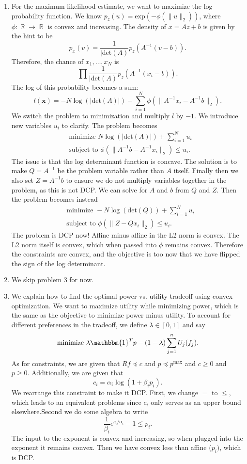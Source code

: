 \documentclass{article}
\DeclareMathOperator{\R}{\mathbb{R}}
\begin{document}
\begin{enumerate}
    \item For the maximum likelihood estimate, we want to maximize the log probability function. We know $p_z(u) = \text{exp}(-\phi(\|u\|_2))$, where $\phi : \R \to \R$ is convex and increasing. The density of $x = Az + b$ is given by the hint to be \[
        p_x(v) = \frac{1}{|\text{det}(A)} p_z(A^{-1}(v - b)).
    \] Therefore, the chance of $x_1, \dots, x_N$ is \[
        \prod \frac{1}{|\text{det}(A)} p_z(A^{-1}(x_i - b)).
    \] The log of this probability becomes a sum: \[
        l(\mathbf{x}) = -N \log(|\text{det}(A)|) - \sum_{i=1}^N \phi(\|A^{-1}x_i - A^{-1} b\|_2).
    \] We switch the problem to minimization and multiply $l$ by $-1$. We introduce new variables $u_i$ to clarify. The problem becomes \begin{align*}
        &\text{minimize } N\log(|\text{det}(A)|) + \sum_{i=1}^N u_i \\
        &\text{subject to } \phi(\|A^{-1} b - A^{-1} x_i \|_2) \leq u_i.
    \end{align*} The issue is that the log determinant function is concave. The solution is to make $Q = A^{-1}$ be the problem variable rather than $A$ itself. Finally then we also set $Z = A^{-1} b$ to ensure we do not multiply variables together in the problem, as this is not DCP. We can solve for $A$ and $b$ from $Q$ and $Z$. Then the problem becomes instead \begin{align*}
        &\text{minimize } -N\log(\text{det}(Q)) + \sum_{i=1}^N u_i \\
        &\text{subject to } \phi(\|Z - Q x_i \|_2) \leq u_i.
    \end{align*} The problem is DCP now! Affine minus affine in the L2 norm is convex. The L2 norm itself is convex, which when passed into $\phi$ remains convex. Therefore the constraints are convex, and the objective is too now that we have flipped the sign of the log determinant.
    
    \item We skip problem 3 for now.

    \item We explain how to find the optimal power vs. utility tradeoff using convex optimization. We want to maximize utility while minimizing power, which is the same as the objective to minimize power minus utility. To account for different preferences in the tradeoff, we define $\lambda \in [0, 1]$ and say \[
            \text{minimize } \lambda \mathbbm{1}^T p - (1 - \lambda) \sum_{j = 1}^n U_j(f_j).
        \] As for constraints, we are given that $Rf \preceq c$ and $p \preceq p^\text{max}$ and $c \geq 0$ and $p \geq 0$. Additionally, we are given that \[
            c_i = \alpha_i \log(1 + \beta_i p_i).
        \] We rearrange this constraint to make it DCP. First, we change $=$ to $\leq$, which leads to an equivalent problems since $c_i$ only serves as an upper bound elsewhere.Second we do some algebra to write \[
            \frac{1}{\beta_i} e^{c_i / \alpha_i} - 1 \leq p_i.
        \] The input to the exponent is convex and increasing, so when plugged into the exponent it remains convex. Then we have convex less than affine ($p_i)$, which is DCP. \\


\end{enumerate}
\end{document}
